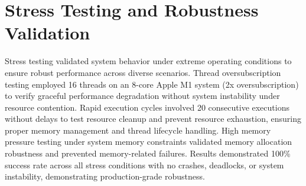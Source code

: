 \section{Stress Testing and Robustness Validation}
\label{appendix:stress_testing}

Stress testing validated system behavior under extreme operating conditions to ensure robust performance across diverse scenarios. Thread oversubscription testing employed 16 threads on an 8-core Apple M1 system (2x oversubscription) to verify graceful performance degradation without system instability under resource contention. Rapid execution cycles involved 20 consecutive executions without delays to test resource cleanup and prevent resource exhaustion, ensuring proper memory management and thread lifecycle handling. High memory pressure testing under system memory constraints validated memory allocation robustness and prevented memory-related failures. Results demonstrated 100\% success rate across all stress conditions with no crashes, deadlocks, or system instability, demonstrating production-grade robustness.


